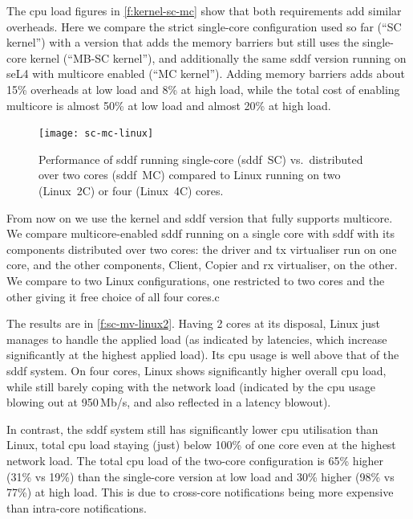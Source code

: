 \documentclass[a4paper,12pt]{report}
\begin{document}
The \gls{cpu} load figures in \autoref{f:kernel-sc-mc} show that both
requirements add similar overheads. Here we compare the strict
single-core configuration used so far (``SC kernel'') with a version
that adds the memory barriers but still uses the single-core kernel
(``MB-SC kernel''), and additionally the same \gls{sddf} version running on
seL4 with multicore enabled (``MC kernel''). Adding memory barriers
adds about 15\% overheads at low load and 8\% at high load, while the
total cost of enabling multicore is almost 50\% at low load and almost
20\% at high load.

\begin{figure}[t]
  \centering
  \texttt{[image: sc-mc-linux]}
  \caption[Single- and two-core \gls{sddf} performance compared to 2-core
  Linux.]{Performance of \gls{sddf} running single-core (\gls{sddf}~SC) vs.\ distributed over
    two cores (\gls{sddf}~MC) compared to Linux running on two (Linux~2C) or
    four (Linux~4C) cores.}
  \label{f:sc-mv-linux2}
\end{figure}

From now on we use the kernel and \gls{sddf} version that fully supports multicore.
We compare multicore-enabled \gls{sddf} running on a single core
with \gls{sddf} with its components distributed over two cores:
the driver and \gls{tx} virtualiser run on one core,
and the other components, Client, Copier and \gls{rx} virtualiser, on the other. We
compare to two Linux configurations, one restricted to two cores and
the other giving it free choice of all four cores.c

The results are in \autoref{f:sc-mv-linux2}.
Having 2 cores at its disposal, Linux just manages to handle the
applied load (as indicated by latencies, which increase significantly
at the highest applied load). Its \gls{cpu} usage is well above that of the
\gls{sddf} system. On four cores, Linux shows significantly higher overall
\gls{cpu} load, while still barely coping with the network load (indicated
by the \gls{cpu} usage blowing out at 950\,Mb/s, and also reflected in a
latency blowout).

In contrast, the \gls{sddf} system still has significantly lower \gls{cpu}
utilisation than Linux, total \gls{cpu} load staying (just) below 100\% of
one core even at the highest network load. The total \gls{cpu} load of the
two-core configuration is 65\% higher (31\% vs 19\%) than the
single-core version at low load and 30\% higher (98\% vs 77\%) at high
load. This is due to
cross-core notifications being more expensive than intra-core
notifications.
\end{document}
